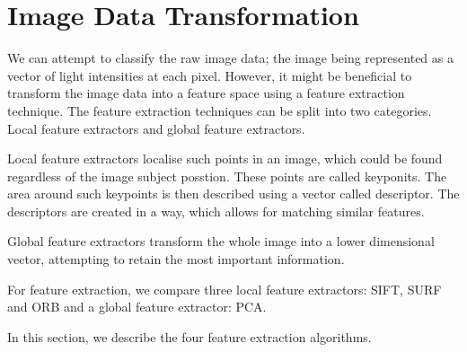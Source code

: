 \chapter{Image Data Transformation}

We can attempt to classify the raw image data; the image being represented as a vector of light intensities at each pixel. However, it might be beneficial to transform the image data into a feature space using a feature extraction technique. The feature extraction techniques can be split into two categories. Local feature extractors and global feature extractors. %

Local feature extractors localise such points in an image, which could be found regardless of the image subject posstion. These points are called keyponits. The area around such keypoints is then described using a vector called descriptor. The descriptors are created in a way, which allows for matching similar features.

Global feature extractors transform the whole image into a lower dimensional vector, attempting to retain the most important information.

For feature extraction, we compare three local feature extractors: SIFT, SURF and ORB and a global feature extractor: PCA.

In this section, we describe the four feature extraction algorithms.







%

